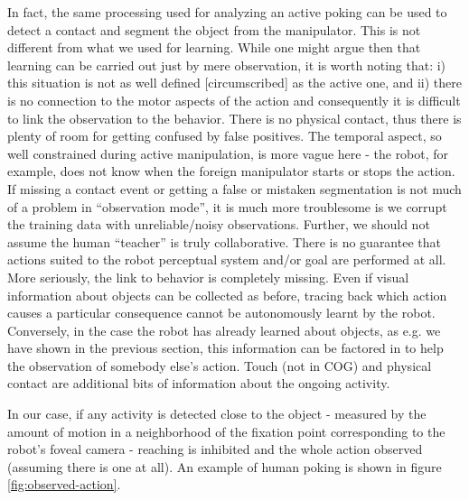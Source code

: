In fact, the same processing used for analyzing an active poking 
can be used to detect a contact and segment the object from the manipulator.
This is not different from what we used for learning. While one might argue then
that learning can be carried out just by mere observation, it is
worth noting that: i) this situation is not as well defined [circumscribed] 
as the active one, and ii) there is no connection to the motor aspects 
of the action and consequently it is difficult to link the observation to the behavior.
There is no physical contact, thus there is plenty of room for getting confused 
by false positives. The temporal aspect, so well constrained during active manipulation, is 
more vague here - the robot, for example, does not know when the foreign manipulator starts
or stops the action. If missing a contact event or getting a false or mistaken 
segmentation is not much of a problem in ``observation mode'', it is much more
troublesome is we corrupt the training data with unreliable/noisy observations.
Further, we should not assume the human ``teacher'' is truly collaborative. 
There is no guarantee that actions suited to the robot perceptual system and/or 
goal are performed at all.
More seriously, the link to behavior is completely missing. Even if visual 
information about objects can be collected as before, tracing back which action
causes a particular consequence cannot be autonomously learnt by the robot.
Conversely, in the case the robot has already learned about objects, 
as e.g. we have shown in the previous section, this information can be
factored in to help the observation of somebody else's action. Touch 
(not in COG) and physical contact are additional bits of information 
about the ongoing activity.

In our case, if any activity is detected close to the object - measured by the 
amount of motion in a neighborhood of the fixation point corresponding to the robot's foveal 
camera - reaching is inhibited and the whole action observed (assuming there 
is one at all). An example of human poking is shown in figure \ref{fig:observed-action}.

